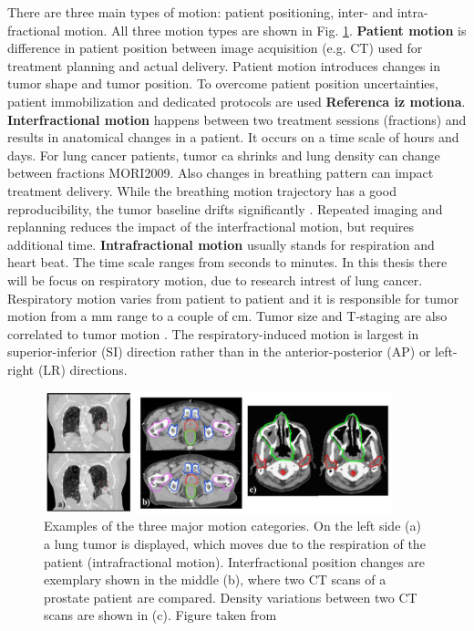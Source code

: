 \documentclass[type=dr, dr=rernat, accentcolor=tud7b,colorbacktitle, bigchapter, openright, twoside, 12pt ]{tudthesis}
\begin{document}
There are three main types of motion: patient positioning, inter- and intra-fractional motion. All three motion types are shown in Fig. \ref{motion}.
\newline
\textbf{Patient motion} is difference in patient position between image acquisition (e.g. CT) used for treatment planning and actual delivery. Patient motion introduces changes in tumor shape and tumor position. To overcome patient 
position uncertainties, patient immobilization and dedicated protocols are used \textbf{Referenca iz motiona}.
\newline
\textbf{Interfractional motion} happens between two treatment sessions (fractions) and results in anatomical changes in a patient. It occurs on a time scale of hours and days. For lung cancer patients, tumor ca shrinks and lung density can change between fractions MORI2009. 
Also changes in breathing pattern can impact treatment delivery. While the breathing motion trajectory has a good reproducibility, the tumor baseline drifts significantly \cite{Sonke2008}. Repeated imaging and replanning reduces the impact of the interfractional motion, but requires additional time.
\newline
\textbf{Intrafractional motion} usually stands for respiration and heart beat. The time scale ranges from seconds to minutes. In this thesis there will be focus on respiratory motion, due to research intrest of lung cancer. Respiratory motion varies from patient to patient and 
it is responsible for tumor motion from a mm range to a couple of cm. Tumor size and T-staging are also correlated to tumor motion \cite{Liu2007}. The respiratory-induced motion is largest in superior-inferior (SI) direction rather than 
in the anterior-posterior (AP) or left-right (LR) directions.


\begin{figure}[H]
\begin{center}
\includegraphics[width=0.9\textwidth]{./Images/motion_examples.png}
\caption{Examples of the three major motion categories. On the left side (a) a lung tumor is displayed, which moves due to the respiration 
of the patient (intrafractional motion). Interfractional position changes are exemplary shown in the middle (b), where two CT scans of a 
prostate patient are compared. Density variations between two CT scans are shown in (c). Figure taken from \cite{Eng11}}
\label{motion}
\end{center}
\end{figure}
\end{document}
